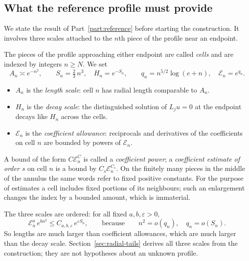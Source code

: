 \subsection{What the reference profile must provide}
\label{sec:radial-what}

We state the result of Part~\ref{part:reference} before starting the
construction. It involves three scales attached to the $n$th piece of
the profile near an endpoint.

\begin{definition}\label{def:radial-weights}
The pieces of the profile approaching either endpoint are called
\emph{cells} and are indexed by integers $n\ge N$. We set
\begin{equation}\label{eq:rad-eq-endpoint-weights}
 A_n\asymp e^{-n^2},\qquad
 S_n=\tfrac23\,n^3,\quad H_n=e^{-S_n},\qquad
 q_n=n^{5/2}\log(e+n),\quad \mathcal E_n=e^{q_n}.
\end{equation}
\begin{itemize}
\item $A_n$ is the \emph{length scale}: cell $n$ has radial length
 comparable to $A_n$.
\item $H_n$ is the \emph{decay scale}: the distinguished solution of
 $L_j u=0$ at the endpoint decays like $H_n$ across the cells.
\item $\mathcal E_n$ is the \emph{coefficient allowance}: reciprocals
 and derivatives of the coefficients on cell $n$ are bounded by powers
 of $\mathcal E_n$.
\end{itemize}
A bound of the form $C\mathcal E_n^{C}$ is called a \emph{coefficient
power}; a \emph{coefficient estimate of order $s$} on cell $n$ is a
bound by $C_s\mathcal E_n^{C_s}$. On the finitely many pieces in the
middle of the annulus the same words refer to fixed positive
constants. For the purpose of estimates a cell includes fixed portions
of its neighbours; such an enlargement changes the index by a bounded
amount, which is immaterial.
\end{definition}

The three scales are ordered: for all fixed $a,b,\varepsilon>0$,
\begin{equation}\label{eq:rad-scale-separation}
 \mathcal E_n^{a}\,e^{bn^2}\le C_{a,b,\varepsilon}\,e^{\varepsilon S_n},
 \qquad\text{because}\qquad n^2=o(q_n),\quad q_n=o(S_n).
\end{equation}
So lengths are much larger than coefficient allowances, which are much
larger than the decay scale. Section~\ref{sec:radial-tails} derives all
three scales from the construction; they are not hypotheses about an
unknown profile.

